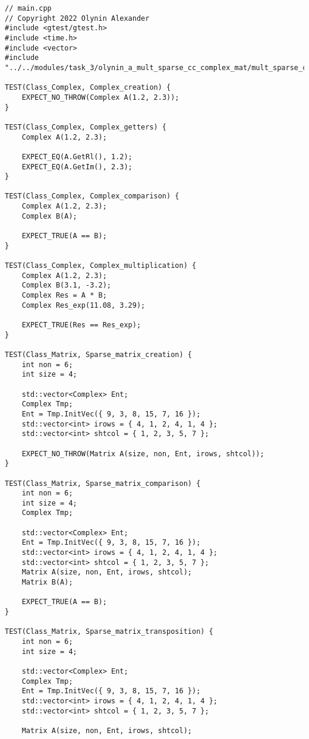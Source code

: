 \documentclass[12pt]{report}
\begin{document}
\begin{lstlisting}
\end{lstlisting}

\begin{lstlisting}
// main.cpp
// Copyright 2022 Olynin Alexander
#include <gtest/gtest.h>
#include <time.h>
#include <vector>
#include "../../modules/task_3/olynin_a_mult_sparse_cc_complex_mat/mult_sparse_cc_complex_mat.h"

TEST(Class_Complex, Complex_creation) {
    EXPECT_NO_THROW(Complex A(1.2, 2.3));
}

TEST(Class_Complex, Complex_getters) {
    Complex A(1.2, 2.3);

    EXPECT_EQ(A.GetRl(), 1.2);
    EXPECT_EQ(A.GetIm(), 2.3);
}

TEST(Class_Complex, Complex_comparison) {
    Complex A(1.2, 2.3);
    Complex B(A);

    EXPECT_TRUE(A == B);
}

TEST(Class_Complex, Complex_multiplication) {
    Complex A(1.2, 2.3);
    Complex B(3.1, -3.2);
    Complex Res = A * B;
    Complex Res_exp(11.08, 3.29);

    EXPECT_TRUE(Res == Res_exp);
}

TEST(Class_Matrix, Sparse_matrix_creation) {
    int non = 6;
    int size = 4;

    std::vector<Complex> Ent;
    Complex Tmp;
    Ent = Tmp.InitVec({ 9, 3, 8, 15, 7, 16 });
    std::vector<int> irows = { 4, 1, 2, 4, 1, 4 };
    std::vector<int> shtcol = { 1, 2, 3, 5, 7 };

    EXPECT_NO_THROW(Matrix A(size, non, Ent, irows, shtcol));
}

TEST(Class_Matrix, Sparse_matrix_comparison) {
    int non = 6;
    int size = 4;
    Complex Tmp;

    std::vector<Complex> Ent;
    Ent = Tmp.InitVec({ 9, 3, 8, 15, 7, 16 });
    std::vector<int> irows = { 4, 1, 2, 4, 1, 4 };
    std::vector<int> shtcol = { 1, 2, 3, 5, 7 };
    Matrix A(size, non, Ent, irows, shtcol);
    Matrix B(A);

    EXPECT_TRUE(A == B);
}

TEST(Class_Matrix, Sparse_matrix_transposition) {
    int non = 6;
    int size = 4;

    std::vector<Complex> Ent;
    Complex Tmp;
    Ent = Tmp.InitVec({ 9, 3, 8, 15, 7, 16 });
    std::vector<int> irows = { 4, 1, 2, 4, 1, 4 };
    std::vector<int> shtcol = { 1, 2, 3, 5, 7 };

    Matrix A(size, non, Ent, irows, shtcol);


\end{lstlisting}
\end{document}
